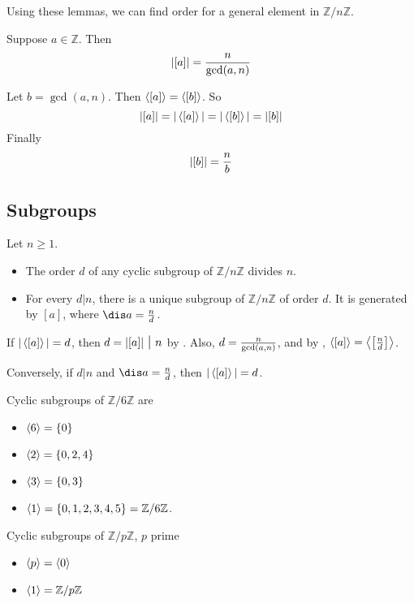 Using these lemmas, we can find order for a general element in $\mathbb Z/n\mathbb Z$.

\begin{prop}
Suppose $a\in \mathbb Z$. Then 
$$|[a]| = {n\over \gcd(a,n)}$$
\end{prop}

\begin{pf}
Let $b=\gcd(a,n)$. Then $\left\langle [a] \right\rangle=\left\langle [b] \right\rangle$. So
$$
|[a]| = |\left\langle [a] \right\rangle| = |\left\langle [b] \right\rangle| = |[b]|
$$
Finally 
$$|[b]| = {n\over b}$$
\end{pf}

\subsection*{Subgroups}
\begin{corr}
Let $n\ge 1$.
\begin{itemize}
	\item The order $d$ of any cyclic subgroup of $\mathbb Z/n\mathbb Z$ divides $n$.
	\item For every $d|n$, there is a unique subgroup of $\mathbb Z/n\mathbb Z$ of order $d$. It is generated by $[a]$, where $\dis a={n\over d}$.
\end{itemize}
\end{corr}

\begin{pf}
If $|\left\langle [a] \right\rangle|=d$, then $d=|[a]|\midd n$ by .
Also, $d={n\over \gcd(a,n)}$, and by , $\left\langle [a] \right\rangle = \left\langle \left[{n\over d}\right] \right\rangle$.

Conversely, if $d|n$ and $\dis a={n\over d}$, then $|\left\langle [a] \right\rangle| = d$.
\end{pf}

\begin{ex}
Cyclic subgroups of $\mathbb Z/6\mathbb Z$ are 
\begin{itemize}
	\item $\left\langle 6 \right\rangle=\{0\}$
	\item $\left\langle 2 \right\rangle = \{0,2,4\}$
	\item $\left\langle 3 \right\rangle = \{0,3\}$
	\item $\left\langle 1 \right\rangle = \{0,1,2,3,4,5\}= \mathbb Z/6\mathbb Z$.
\end{itemize}

Cyclic subgroups of $\mathbb Z/p\mathbb Z$, $p$ prime
\begin{itemize}
\item $\left\langle p \right\rangle = \left\langle 0 \right\rangle$
\item $\left\langle 1 \right\rangle = \mathbb Z/p\mathbb Z$
\end{itemize}
\end{ex}

